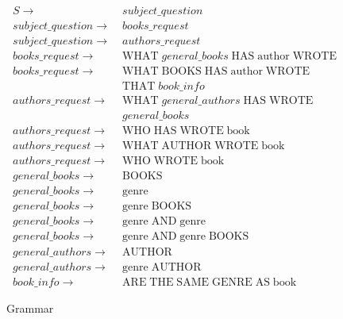 \documentclass[11pt]{article}
\begin{document}
\begin{figure}[h!]

\setcounter{equation}{0}
\begin{align}
S \rightarrow\; & subject\_question \label{gram:subj}\\
subject\_question \rightarrow\; & books\_request \label{gram:books}\\
subject\_question \rightarrow\; & authors\_request \label{gram:auths}\\
books\_request \rightarrow\; &
\text{WHAT} \; general\_books \; \text{HAS} \; \text{author} \; \text{WROTE} 
\label{gram:sim_books}\\
books\_request \rightarrow\; & \label{gram:comp_books}
\text{WHAT} \; \text{BOOKS} \; \text{HAS} \; \text{author} \; \text{WROTE}\\
&\text{THAT} \; book\_info \nonumber\\
authors\_request \rightarrow\; &
\text{WHAT} \; general\_authors \; \text{HAS} \; \text{WROTE} \\
&general\_books \nonumber \label{gram:comp_auths}\\
authors\_request \rightarrow\; &
\text{WHO} \; \text{HAS} \; \text{WROTE} \; \text{book}\\
authors\_request \rightarrow\; &
\text{WHAT} \; \text{AUTHOR} \; \text{WROTE} \; \text{book}\\
authors\_request \rightarrow\; &
\text{WHO} \; \text{WROTE} \; \text{book} \label{gram:who_wrote}\\
general\_books \rightarrow\; & \text{BOOKS} \label{gram:simp_gen_books}\\
general\_books \rightarrow\; & \text{genre}\\
general\_books \rightarrow\; & \text{genre} \; \text{BOOKS} \label{gram:comp_gen_books}\\
general\_books \rightarrow\; & 
\text{genre} \; \text{AND} \; \text{genre}\\
general\_books \rightarrow\; & 
\text{genre} \; \text{AND} \; \text{genre} \; \text{BOOKS}\\
general\_authors \rightarrow\; & \text{AUTHOR} \label{gram:simp_gen_auths}\\
general\_authors \rightarrow\; & \text{genre} \; \text{AUTHOR} \label{gram:comp_gen_auths}\\
book\_info \rightarrow\; & \text{ARE} \; \text{THE} \; \text{SAME} \; \text{GENRE} \;
\text{AS} \; \text{book} \label{gram:book_info}
\end{align}

\caption{Grammar}
\label{fig:grammar}
\end{figure}
\end{document}
